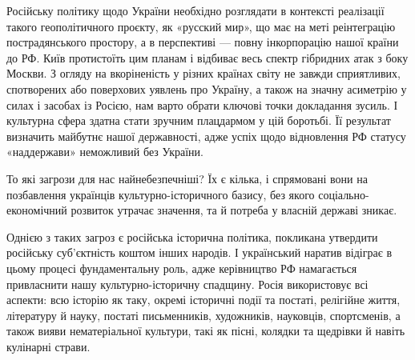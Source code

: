 
Російську політику щодо України необхідно розглядати в контексті реалізації
такого геополітичного проєкту, як «русский мир», що має на меті реінтеграцію
пострадянського простору, а в перспективі — повну інкорпорацію нашої країни до
РФ. Київ протистоїть цим планам і відбиває весь спектр гібридних атак з боку
Москви. З огляду на вкоріненість у різних країнах світу не завжди сприятливих,
спотворених або поверхових уявлень про Україну, а також на значну асиметрію у
силах і засобах із Росією, нам варто обрати ключові точки докладання зусиль. І
культурна сфера здатна стати зручним плацдармом у цій боротьбі. Її результат
визначить майбутнє нашої державності, адже успіх щодо відновлення РФ статусу
«наддержави» неможливий без України.


То які загрози для нас найнебезпечніші? Їх є кілька, і спрямовані вони на
позбавлення українців культурно-історичного базису, без якого
соціально-економічний розвиток утрачає значення, та й потреба у власній державі
зникає.

Однією з таких загроз є російська історична політика, покликана утвердити
російську суб’єктність коштом інших народів. І український наратив відіграє в
цьому процесі фундаментальну роль, адже керівництво РФ намагається привласнити
нашу культурно-історичну спадщину. Росія використовує всі аспекти: всю історію
як таку, окремі історичні події та постаті, релігійне життя, літературу й
науку, постаті письменників, художників, науковців, спортсменів, а також вияви
нематеріальної культури, такі як пісні, колядки та щедрівки й навіть кулінарні
страви.


